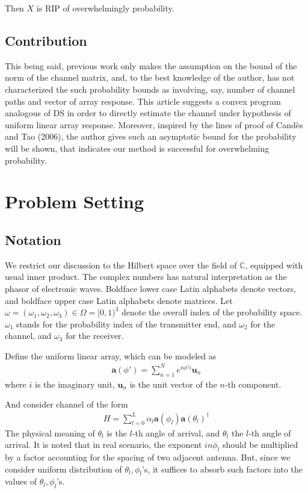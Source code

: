 \documentclass[12pt]{article}
\begin{document}
Then \(X\) is RIP of overwhelmingly probability.

\subsection{Contribution}

This being said, previous work only makes the assumption on the bound of the norm of the channel matrix, and, to the best knowledge of the author, has not characterized the such probability bounds as involving, say, number of channel paths and vector of array response.
This article suggests a convex program analogous of DS in order to directly estimate the channel under hypothesis of uniform linear array response.
Moreover, inspired by the lines of proof of Cand\`es and Tao (2006), the author gives such an asymptotic bound for the probability will be shown, that indicates our method is successful for overwhelming probability.


\section{Problem Setting}

\subsection{Notation}

We restrict our discussion to the Hilbert space over the field of \(\mathbb{C}\), equipped with usual inner product.
The complex numbers has natural interpretation as the phasor of electronic waves.
Boldface lower case Latin alphabets denote vectors, and boldface upper case Latin alphabets denote matrices.
Let \(\omega =(\omega_1, \omega_2, \omega_3) \in \Omega =[0,1)^3\) denote the overall index of the probability space.
\(\omega_1\) stands for the probability index of the transmitter end, and \(\omega_2\) for the channel, and \(\omega_3\) for the receiver.

Define the uniform linear array, which can be modeled as
\begin{gather*}
\mathbf{a}(\phi')
=\sum_{n=1}^{N} e^{n \phi' i} \mathbf{u}_n
\end{gather*}
where \(i\) is the imaginary unit, \(\mathbf{u}_n\) is the unit vector of the \(n\)-th component.

And consider channel of the form
\begin{gather*}
H
=\sum_{l=0}^L \alpha_l \mathbf{a}(\phi_l) \mathbf{a}(\theta_l)^\dagger
\end{gather*}
The physical meaning of  \(\theta_l\) is the \(l\)-th angle of arrival, and \(\theta_l\) the \(l\)-th angle of arrival.
It is noted that in real scenario, the exponent \(i n \phi_l\) should be multiplied by a factor accounting for the spacing of two adjacent antenna.
But, since we consider uniform distribution of \(\theta_l, \phi_l\)'s, it suffices to absorb such factors into the values of \(\theta_l, \phi_l\)'s.
\end{document}
